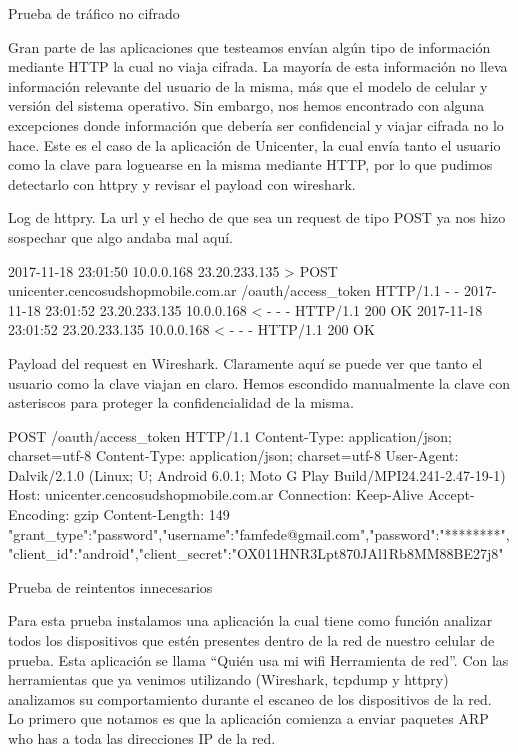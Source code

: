 Prueba de tráfico no cifrado

Gran parte de las aplicaciones que testeamos envían algún tipo de información mediante HTTP la cual no viaja cifrada. La mayoría de esta información no lleva información relevante del usuario de la misma, más que el modelo de celular y versión del sistema operativo. Sin embargo, nos hemos encontrado con alguna excepciones donde información que debería ser confidencial y viajar cifrada no lo hace. Este es el caso de la aplicación de Unicenter, la cual envía tanto el usuario como la clave para loguearse en la misma mediante HTTP, por lo que pudimos detectarlo con httpry y revisar el payload con wireshark. 

Log de httpry. La url y el hecho de que sea un request de tipo POST ya nos hizo sospechar que algo andaba mal aquí.

2017-11-18 23:01:50	10.0.0.168	23.20.233.135	>	POST	unicenter.cencosudshopmobile.com.ar	/oauth/access_token	HTTP/1.1	-	-
2017-11-18 23:01:52	23.20.233.135	10.0.0.168	<	-	-	-	HTTP/1.1	200	OK
2017-11-18 23:01:52	23.20.233.135	10.0.0.168	<	-	-	-	HTTP/1.1	200	OK

Payload del request en Wireshark. Claramente aquí se puede ver que tanto el usuario como la clave viajan en claro. Hemos escondido manualmente la clave con asteriscos para proteger la confidencialidad de la misma.

POST /oauth/access_token HTTP/1.1
Content-Type: application/json; charset=utf-8
Content-Type: application/json; charset=utf-8
User-Agent: Dalvik/2.1.0 (Linux; U; Android 6.0.1; Moto G Play Build/MPI24.241-2.47-19-1)
Host: unicenter.cencosudshopmobile.com.ar
Connection: Keep-Alive
Accept-Encoding: gzip
Content-Length: 149
{"grant_type":"password","username":"famfede@gmail.com","password":"********","client_id":"android","client_secret":"OX011HNR3Lpt870JAl1Rb8MM88BE27j8"}


Prueba de reintentos innecesarios

Para esta prueba instalamos una aplicación la cual tiene como función analizar todos los dispositivos que estén presentes dentro de la red de nuestro celular de prueba. Esta aplicación se llama “Quién usa mi wifi Herramienta de red”. Con las herramientas que ya venimos utilizando (Wireshark, tcpdump y httpry) analizamos su comportamiento durante el escaneo de los dispositivos de la red. Lo primero que notamos es que la aplicación comienza a enviar paquetes ARP who has a toda las direcciones IP de la red. 

